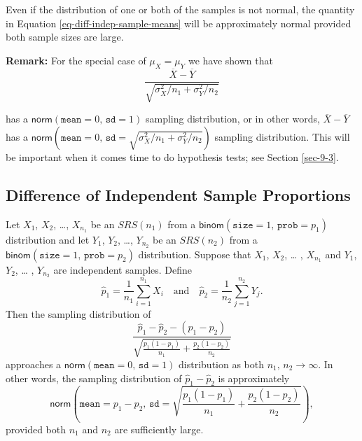 \begin{rem}
Even if the distribution of one or both of the samples is not normal,
the quantity in Equation \eqref{eq-diff-indep-sample-means} will be
approximately normal provided both sample sizes are large.
\end{rem}

\textbf{Remark:} For the special case of \(\mu_{X}=\mu_{Y}\) we have shown
 that
\begin{equation}
\frac{\overline{X} - \overline{Y}}{\sqrt{ \sigma_{X}^{2}/ n_{1} + \sigma_{Y}^{2}/n_{2}}}
\end{equation}

has a \(\mathsf{norm}(\mathtt{mean}=0,\,\mathtt{sd}=1)\) sampling
distribution, or in other words, \(\overline{X} - \overline{Y}\) has a
\(\mathsf{norm}(\mathtt{mean} = 0,\,\mathtt{sd} = \sqrt{\sigma_{X}^{2}
/ n_{1} + \sigma_{Y}^{2} / n_{2}})\) sampling distribution. This will
be important when it comes time to do hypothesis tests; see Section
\ref{sec-9-3}.


\subsection{Difference of Independent Sample Proportions}
\label{sec-8-4-2}

\begin{prop}
Let \(X_{1}\), \(X_{2}\), \ldots{}, \(X_{n_{1}}\) be an \(SRS(n_{1})\) from
a \(\mathsf{binom}(\mathtt{size}=1,\,\mathtt{prob}=p_{1})\)
distribution and let \(Y_{1}\), \(Y_{2}\), \ldots{}, \(Y_{n_{2}}\) be an
\(SRS(n_{2})\) from a
\(\mathsf{binom}(\mathtt{size}=1,\,\mathtt{prob}=p_{2})\)
distribution. Suppose that \(X_{1}\), \(X_{2}\), \ldots{} , \(X_{n_{1}}\)
and \(Y_{1}\), \(Y_{2}\), \ldots{} , \(Y_{n_{2}}\) are independent
samples. Define
\begin{equation}
\hat{p}_{1}=\frac{1}{n_{1}}\sum_{i=1}^{n_{1}}X_{i}\quad \mbox{and}\quad \hat{p}_{2}=\frac{1}{n_{2}}\sum_{j=1}^{n_{2}}Y_{j}.
\end{equation}
Then the sampling distribution of
\begin{equation}
\frac{\hat{p}_{1}-\hat{p}_{2}-(p_{1}-p_{2})}{\sqrt{\frac{p_{1}(1-p_{1})}{n_{1}}+\frac{p_{2}(1-p_{2})}{n_{2}}}}
\end{equation}
approaches a \(\mathsf{norm}(\mathtt{mean}=0,\,\mathtt{sd}=1)\) distribution as both \(n_{1},\, n_{2}\to\infty\). In other words, the sampling distribution of \(\hat{p}_{1}-\hat{p}_{2}\) is approximately
\begin{equation}
\mathsf{norm}\left(\mathtt{mean}=p_{1}-p_{2},\,\mathtt{sd}=\sqrt{\frac{p_{1}(1-p_{1})}{n_{1}}+\frac{p_{2}(1-p_{2})}{n_{2}}}\right),
\end{equation}
provided both \(n_{1}\) and \(n_{2}\) are sufficiently large.
\end{prop}

